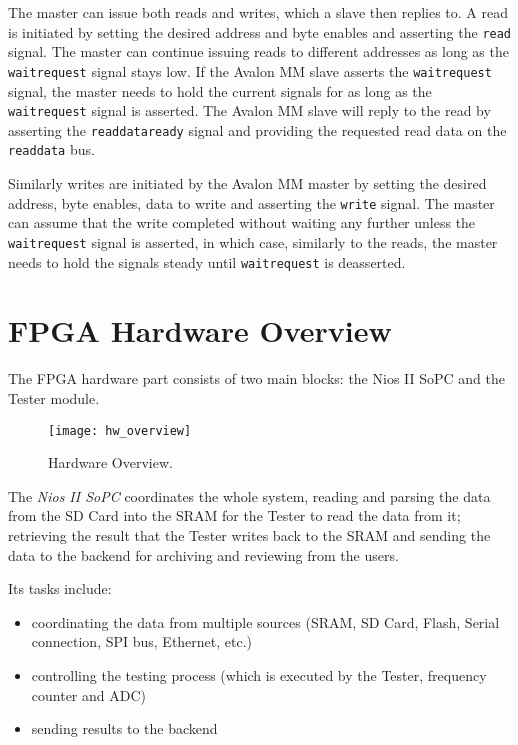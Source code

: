 The master can issue both reads and writes, which a slave then replies to. A read
is initiated by setting the desired address and byte enables and asserting the \texttt{read}
signal. The master can continue issuing reads to different addresses as long as the \texttt{waitrequest}
signal stays low. If the Avalon MM slave asserts the \texttt{waitrequest} signal, the master needs
to hold the current signals for as long as the \texttt{waitrequest} signal is asserted.
The Avalon MM slave will reply to the read by asserting the \texttt{readdataready} signal
and providing the requested read data on the \texttt{readdata} bus.

Similarly writes are initiated by the Avalon MM master by setting the desired address, byte enables,
data to write and asserting the \texttt{write} signal. The master can assume that the write completed
without waiting any further unless the \texttt{waitrequest} signal is asserted, in which case,
similarly to the reads, the master needs to hold the signals steady until \texttt{waitrequest} is deasserted.



\newpage
\section{FPGA Hardware Overview}

The FPGA hardware part consists of two main blocks: the Nios II SoPC and the Tester module.

\begin{figure}
 \centering
 \texttt{[image: hw\_overview]}
 \caption{Hardware Overview.}
 \label{fig:hw_overview}
\end{figure}



The \textit{Nios II SoPC} coordinates the whole system, reading and parsing the data from the SD Card
into the SRAM for the Tester to read the data from it; retrieving the result that the
Tester writes back to the SRAM and sending the data to the backend for archiving and reviewing from the users.

Its tasks include:
\begin{itemize}
 \item coordinating the data from multiple sources (SRAM, SD Card, Flash, Serial connection, SPI bus, Ethernet, etc.)
 \item controlling the testing process (which is executed by the Tester, frequency counter and ADC)
 \item sending results to the backend
\end{itemize}


